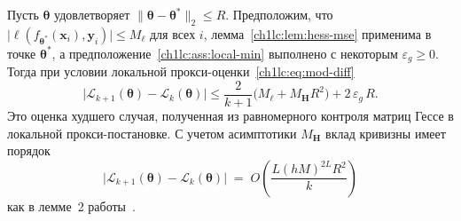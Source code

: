\begin{theorem}\label{ch1lc:thm:landscape-mse}
Пусть $\boldsymbol{\theta}$ удовлетворяет $\|\boldsymbol{\theta}-\boldsymbol{\theta}^*\|_2\le R$.
Предположим, что $\bigl|\ell(f_{\boldsymbol{\theta}^*}(\mathbf{x}_i),\mathbf{y}_i)\bigr|\le M_{\ell}$ для всех $i$, лемма~\ref{ch1lc:lem:hess-mse} применима в точке $\boldsymbol{\theta}^*$, а предположение~\ref{ch1lc:ass:local-min} выполнено с некоторым $\varepsilon_g\ge 0$.
Тогда при условии локальной прокси-оценки~\eqref{ch1lc:eq:mod-diff}
\begin{equation}\label{ch1lc:eq:thm-bound}
  \bigl|\mathcal{L}_{k+1}(\boldsymbol{\theta}) - \mathcal{L}_k(\boldsymbol{\theta})\bigr|
  \le \frac{2}{k+1}\bigl( M_{\ell} + M_{\mathbf{H}} R^2 \bigr) + 2\,\varepsilon_g\, R .
\end{equation}
Это оценка худшего случая, полученная из равномерного контроля матриц Гессе в локальной прокси-постановке. С учетом асимптотики $M_{\mathbf{H}}$ вклад кривизны имеет порядок
\begin{equation}\label{ch1lc:eq:rate}
  \bigl|\mathcal{L}_{k+1}(\boldsymbol{\theta}) - \mathcal{L}_k(\boldsymbol{\theta})\bigr|
  \;=\; O\!\left(\frac{L(hM)^{2L} R^2}{k}\right)
\end{equation}
как в лемме~2 работы~\cite{grabovoi2024unraveling748584228}.


\end{theorem}
